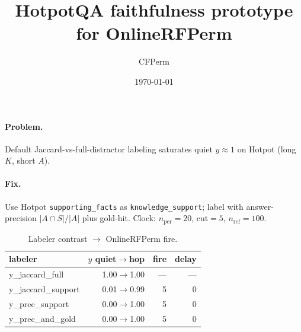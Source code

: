 \documentclass[11pt]{article}
\title{HotpotQA faithfulness prototype for OnlineRFPerm}
\author{CFPerm}
\date{\today}
\begin{document}
\maketitle
\paragraph{Problem.}
Default Jaccard-vs-full-distractor labeling saturates quiet $y\approx 1$ on Hotpot (long $K$, short $A$).
\paragraph{Fix.}
Use Hotpot \texttt{supporting\_facts} as \texttt{knowledge\_support}; label with answer-precision $|A\cap S|/|A|$ plus gold-hit.
Clock: $n_{\mathrm{per}}=20$, cut$=5$, $n_{\mathrm{ref}}=100$.
\begin{table}[h]\centering
\caption{Labeler contrast $\to$ OnlineRFPerm fire.}
\begin{tabular}{lrrr}
\toprule labeler & $y$ quiet$\to$hop & fire & delay \\
\midrule
y\_jaccard\_full & 1.00$\to$1.00 & --- & --- \\
y\_jaccard\_support & 0.01$\to$0.99 & 5 & 0 \\
y\_prec\_support & 0.00$\to$1.00 & 5 & 0 \\
y\_prec\_and\_gold & 0.00$\to$1.00 & 5 & 0 \\
\bottomrule\end{tabular}\end{table}
\end{document}
